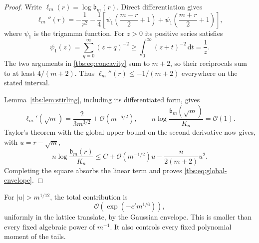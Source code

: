 \documentclass[11pt,a4paper]{article}
\numberwithin{equation}{section}
\theoremstyle{definition}
\newcommand{\bcont}{\mathfrak b}
\newcommand{\dd}{\,\mathrm d}
\newcommand{\OO}{\mathcal O}
\begin{document}
\begin{proof}
Write $\ell_m(r)=\log\bcont_m(r)$. Direct differentiation gives
\begin{equation}\label{tbs:eq:concavity}
 \ell_m''(r)=-\frac1{r^2}
 -\frac14\left[
 \psi_1\!\left(\frac{m-r}2+1\right)
 +\psi_1\!\left(\frac{m+r}2+1\right)\right],
\end{equation}
where $\psi_1$ is the trigamma function. For $z>0$ its positive series
satisfies
\[
 \psi_1(z)=\sum_{q=0}^{\infty}(z+q)^{-2}
 \ge\int_0^\infty(z+t)^{-2}\dd t=\frac1z.
\]
The two arguments in \eqref{tbs:eq:concavity} sum to $m+2$, so their
reciprocals sum to at least $4/(m+2)$. Thus
$\ell_m''(r)\le-1/(m+2)$ everywhere on the stated interval.

Lemma~\ref{tbs:lem:stirling}, including its differentiated form, gives
\[
 \ell_m'(\sqrt m)=\frac{2}{3m^{3/2}}+\OO(m^{-5/2}),\qquad
 n\log\frac{\bcont_m(\sqrt m)}{K_n}=\OO(1).
\]
Taylor's theorem with the global upper bound on the second derivative
now gives, with $u=r-\sqrt m$,
\[
 n\log\frac{\bcont_m(r)}{K_n}
 \le C+\OO(m^{-1/2})u-\frac{n}{2(m+2)}u^2.
\]
Completing the square absorbs the linear term and proves
\eqref{tbs:eq:global-envelope}.
\end{proof}

For $|u|>m^{1/12}$, the total contribution is
\[\OO\!\left(\exp(-c' m^{1/6})\right),\]
uniformly in the lattice translate, by the Gaussian envelope. This is smaller than every fixed algebraic power of $m^{-1}$.
It also controls every fixed polynomial moment of the tails.
\end{document}
